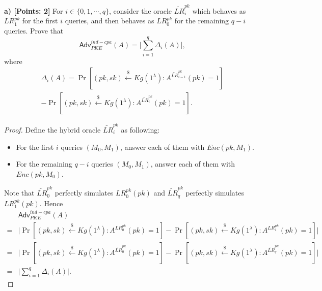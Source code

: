 \documentclass[12pt]{article}
\newcommand{\getsr}{\stackrel{\$}{\gets}}
\newcommand{\Adv}{\textsf{Adv}}
\theoremstyle{definition}
\begin{document}
{\bf a) [Points: 2]} For $i \in \{0,1,\cdots, q\}$, consider the oracle $\widetilde{LR}_i^{pk}$ which behaves as $LR_1^{pk}$ for the first $i$ queries, and then behaves as $LR_0^{pk}$ for the remaining $q-i$ queries. Prove that
$$\Adv_{PKE}^{ind-cpa}(A) = \bigg| \sum_{i=1}^q \Delta_i(A) \bigg|,$$
where
$$\begin{aligned}
\Delta_i(A) = \Pr[(pk,sk)\getsr Kg(1^\lambda) : A^{\widetilde{LR}_{i-1}^{pk}}(pk)=1] \\
- \Pr[(pk,sk)\getsr Kg(1^\lambda) : A^{\widetilde{LR}_{i}^{pk}}(pk)=1].
\end{aligned}$$
\begin{proof}
Define the hybrid oracle $\widetilde{LR}_i^{pk}$ as following: 
\begin{itemize}
\item For the first $i$ queries $(M_0,M_1)$, answer each of them with $Enc(pk, M_1)$.
\item For the remaining $q-i$ queries $(M_0,M_1)$, answer each of them with $Enc(pk, M_0)$.
\end{itemize}
Note that $\widetilde{LR}_0^{pk}$ perfectly simulates $LR_0^{pk}(pk)$ and $\widetilde{LR}_{q}^{pk}$ perfectly simulates $LR_1^{pk}(pk)$.
Hence
$$\begin{aligned}
& \Adv_{PKE}^{ind-cpa}(A) \\
=& \bigg| \Pr[(pk,sk)\getsr Kg(1^\lambda) : A^{LR_0^{pk}}(pk)=1] 
-\Pr[(pk,sk)\getsr Kg(1^\lambda) : A^{LR_1^{pk}}(pk)=1] \bigg|\\
=& \bigg| \Pr[(pk,sk)\getsr Kg(1^\lambda) : A^{\widetilde{LR}_0^{pk}}(pk)=1] 
-\Pr[(pk,sk)\getsr Kg(1^\lambda) : A^{\widetilde{LR}_q^{pk}}(pk)=1] \bigg|\\
=& \bigg| \sum_{i=1}^q \Delta_i(A) \bigg|.
\end{aligned}$$
\end{proof}
\end{document}

